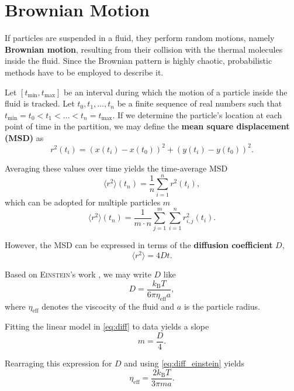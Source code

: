\section{Brownian Motion}
If particles are suspended in a fluid, they perform random motions, namely \textbf{Brownian motion}, resulting from their collision with the thermal molecules inside the fluid.
Since the Brownian pattern is highly chaotic, probabilistic methods have to be employed to describe it.

Let $[t_\text{min}, t_\text{max}]$ be an interval during which the motion of a particle inside the fluid is tracked.
Let $t_0, t_1,\dots,t_n$ be a finite sequence of real numbers such that $t_\text{min}=t_0<t_1<\dots<t_n=t_\text{max}$.
If we determine the particle's location at each point of time in the partition, we may define the \textbf{mean square displacement (MSD)} as
\begin{equation}\label{eq:msd}
	r^2(t_i) = (x(t_i)-x(t_0))^2 + (y(t_i)-y(t_0))^2.
\end{equation}

Averaging these values over time yields the time-average MSD
\begin{equation}\label{eq:tamsd}
	\langle r^2 \rangle(t_n) = \frac{1}{n}\sum_{i=1}^n r^2(t_i),
\end{equation}
which can be adopted for multiple particles $m$
\begin{equation}\label{eq:mptamsd}
	\langle r^2 \rangle(t_n) = \frac{1}{m\cdot n}\sum_{j=1}^m\sum_{i=1}^n r^2_{i,j}(t_i).
\end{equation}

However, the MSD can be expressed in terms of the \textbf{diffusion coefficient} $D$,
\begin{equation}\label{eq:diff}
	\langle r^2 \rangle = 4Dt.
\end{equation}

Based on \textsc{Einstein}'s work \cite{einstein}, we may write $D$ like
\begin{equation}\label{eq:diff_einstein}
	D=\frac{k_\text{B}T}{6\pi\eta_\text{eff}a},
\end{equation}
where $\eta_\text{eff}$ denotes the viscocity of the fluid and $a$ is the particle radius.

Fitting the linear model in \autoref{eq:diff} to data yields a slope
\begin{equation*}
	m = \frac{D}{4}.
\end{equation*}

Rearraging this expression for $D$ and using \autoref{eq:diff_einstein} yields
\begin{equation}\label{eq:vis}
	\eta_\text{eff} = \frac{2k_\text{B}T}{3\pi ma}.
\end{equation}

